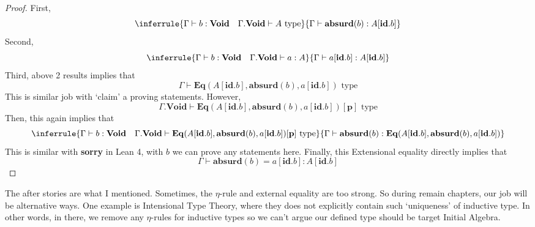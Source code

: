 \documentclass[12pt, a4paper, openany, twoside]{book}
\theoremstyle{definition}
\theoremstyle{remark}
\theoremstyle{plain}
\numberwithin{equation}{section}
\begin{document}
\begin{proof}
First, 
\[
\inferrule
{
    \Gamma \vdash b : \mathbf{Void} \quad \Gamma.\mathbf{Void} \vdash A \text{ type}
}
{
    \Gamma \vdash \mathbf{absurd}(b) : A[\mathbf{id}.b]
}
\]
Second, 
\[
\inferrule
{
    \Gamma \vdash b : \textbf{Void} \quad \Gamma.\mathbf{Void} \vdash a : A 
}
{
    \Gamma \vdash a[\mathbf{id}.b] : A[\mathbf{id}.b]
}
\]
Third, above 2 results implies that 
\[\Gamma \vdash \mathbf{Eq}(A[\mathbf{id}.b], \mathbf{absurd}(b), a[\mathbf{id}.b]) \text{ type}\]
This is similar job with \lq claim' a proving statements. However, 
\[\Gamma.\mathbf{Void} \vdash \mathbf{Eq}(A[\mathbf{id}.b], \mathbf{absurd}(b), a[\mathbf{id}.b])[\mathbf{p}] \text{ type}\]
Then, this again implies that 
\[
\inferrule
{
    \Gamma \vdash b : \mathbf{Void} \quad \Gamma.\mathbf{Void} \vdash \mathbf{Eq}(A[\mathbf{id}.b], \mathbf{absurd}(b), a[\mathbf{id}.b])[\mathbf{p}] \text{ type}
}
{
    \Gamma \vdash \mathbf{absurd}(b) : \mathbf{Eq}(A[\mathbf{id}.b], \mathbf{absurd}(b), a[\mathbf{id}.b])
}
\]
This is similar with \textbf{sorry} in Lean 4, with $b$ we can prove any statements here. Finally, this Extensional equality directly implies that 
\[\Gamma \vdash \mathbf{absurd}(b) = a[\mathbf{id}.b] : A[\mathbf{id}.b]\]
\end{proof}
\noindent The after stories are what I mentioned. Sometimes, the $\eta$-rule and external equality are too strong. 
So during remain chapters, our job will be alternative ways. One example is Intensional Type Theory, where
they does not explicitly contain such \lq uniqueness' of inductive type. In other words, 
in there, we remove any $\eta$-rules for inductive types so we can't argue our 
defined type should be target Initial Algebra. 
\end{document}
